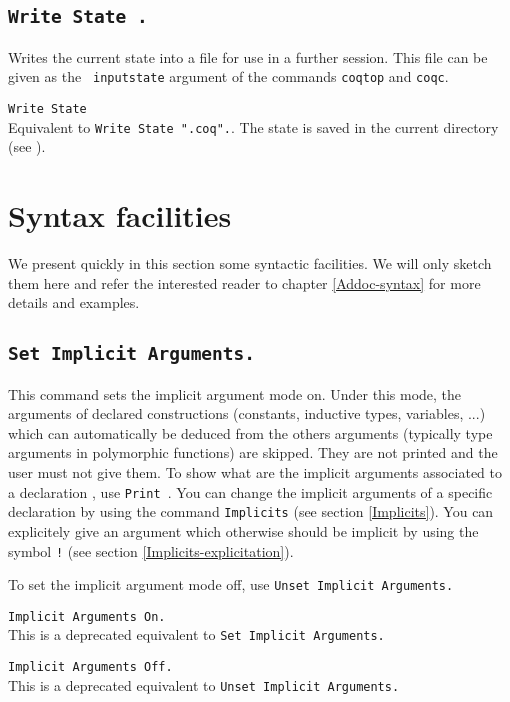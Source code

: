 \subsection{\tt Write State \str.}
Writes the current state into a file \str{} for
use in a further session. This file can be given as the {\tt
  inputstate} argument of the commands {\tt coqtop} and {\tt coqc}.

\begin{Variants}
\item {\tt Write State \ident}\\
 Equivalent to {\tt Write State "}{\ident}{\tt .coq".}.
 The state is saved in the current directory (see \pageref{Pwd}).
\end{Variants}

\section{Syntax facilities}

We present quickly in this section some syntactic facilities.
We will only sketch them here and refer the
interested reader to chapter \ref{Addoc-syntax} for more details and
examples.

\subsection{\tt Set Implicit Arguments.}

This command sets the implicit argument mode on. Under this mode, the
arguments of declared constructions (constants, inductive types,
variables, ...) which can automatically be deduced from the others
arguments (typically type arguments in polymorphic functions) are
skipped. They are not printed and the user must not give them.  To
show what are the implicit arguments associated to a declaration
{\qualid}, use \texttt{Print \qualid}. You can change the implicit
arguments of a specific declaration by using the command
\texttt{Implicits} (see section \ref{Implicits}).  You can explicitely
give an argument which otherwise should be implicit by using the
symbol \verb=!= (see section \ref{Implicits-explicitation}).

To set the implicit argument mode off, use {\tt Unset Implicit Arguments.}

\begin{Variants}
\item {\tt Implicit Arguments On.}\\
This is a deprecated equivalent to {\tt Set Implicit Arguments.} 
\item {\tt Implicit Arguments Off.}\\
This is a deprecated equivalent to {\tt Unset Implicit Arguments.} 
\end{Variants}

